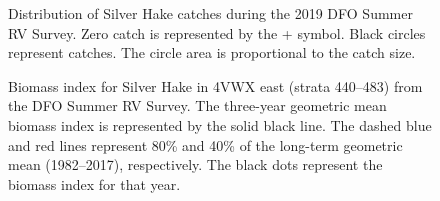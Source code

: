 \documentclass[11pt]{book}
\begin{document}
\begin{figure}[htb]

{\centering {} 

}

\caption{Distribution of Silver Hake catches during the 2019 DFO Summer RV Survey. Zero catch is represented by the + symbol. Black circles represent catches. The circle area is proportional to the catch size.}\label{fig:26-map-silverhake}
\end{figure}

\begin{figure}[htb]

{\centering {} 

}

\caption{Biomass index for Silver Hake in 4VWX east (strata 440--483) from the DFO Summer RV Survey. The three-year geometric mean biomass index is represented by the solid black line. The dashed blue and red lines represent 80\% and 40\% of the long-term geometric mean (1982--2017), respectively. The black dots represent the biomass index for that year.}\label{fig:27-fig-silverhake-biomass4VWX}
\end{figure}
\end{document}
